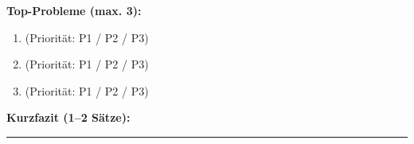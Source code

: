 \noindent\textbf{Top-Probleme (max. 3):}
\begin{enumerate}
    \item \underline{\hspace{8cm}} (Priorität: P1 / P2 / P3)
    \item \underline{\hspace{8cm}} (Priorität: P1 / P2 / P3)
    \item \underline{\hspace{8cm}} (Priorität: P1 / P2 / P3)
\end{enumerate}

\noindent\textbf{Kurzfazit (1–2 Sätze):} \\
\vspace{2cm}
\noindent\rule{\textwidth}{0.4pt}
